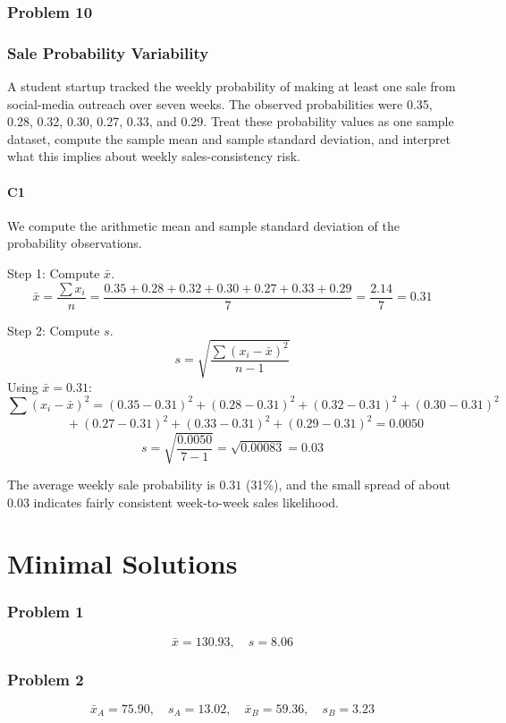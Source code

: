 \begin{ExamProblems}
		\newpage
		\item
		\section{Problem 10}
		\section{Sale Probability Variability}
		A student startup tracked the weekly probability of making at least one sale from social-media outreach over seven weeks. The observed probabilities were 0.35, 0.28, 0.32, 0.30, 0.27, 0.33, and 0.29. Treat these probability values as one sample dataset, compute the sample mean and sample standard deviation, and interpret what this implies about weekly sales-consistency risk.

		\subsection*{C1}
		We compute the arithmetic mean and sample standard deviation of the probability observations.

		Step 1: Compute $\bar{x}$.
		\[
		\bar{x} = \frac{\sum x_i}{n}
		= \frac{0.35+0.28+0.32+0.30+0.27+0.33+0.29}{7}
		= \frac{2.14}{7}
		= 0.31
		\]

		Step 2: Compute $s$.
		\[
		s = \sqrt{\frac{\sum (x_i-\bar{x})^2}{n-1}}
		\]
		Using $\bar{x}=0.31$:
		\[
		\sum (x_i-\bar{x})^2 = (0.35-0.31)^2+(0.28-0.31)^2+(0.32-0.31)^2+(0.30-0.31)^2
		\]
		\[
		\qquad +(0.27-0.31)^2+(0.33-0.31)^2+(0.29-0.31)^2 = 0.0050
		\]
		\[
		s = \sqrt{\frac{0.0050}{7-1}} = \sqrt{0.00083} = 0.03
		\]

		The average weekly sale probability is $0.31$ (31\%), and the small spread of about $0.03$ indicates fairly consistent week-to-week sales likelihood.

	\end{ExamProblems}

\part{Minimal Solutions}
\section*{Problem 1}
\[
\bar{x}=130.93,\quad s=8.06
\]

\section*{Problem 2}
\[
\bar{x}_A=75.90,\quad s_A=13.02,\quad \bar{x}_B=59.36,\quad s_B=3.23
\]

